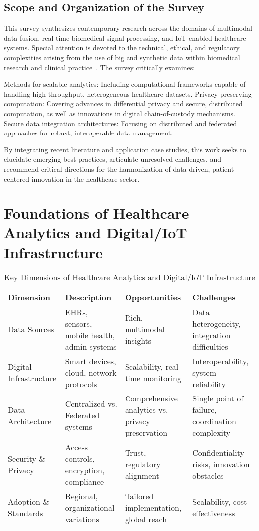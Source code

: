 \documentclass[sigconf]{acmart}
\begin{document}
\subsection{Scope and Organization of the Survey}

This survey synthesizes contemporary research across the domains of multimodal data fusion, real-time biomedical signal processing, and IoT-enabled healthcare systems. Special attention is devoted to the technical, ethical, and regulatory complexities arising from the use of big and synthetic data within biomedical research and clinical practice~\cite{ref91,ref92,ref106}. The survey critically examines:

Methods for scalable analytics: Including computational frameworks capable of handling high-throughput, heterogeneous healthcare datasets.
Privacy-preserving computation: Covering advances in differential privacy and secure, distributed computation, as well as innovations in digital chain-of-custody mechanisms.
Secure data integration architectures: Focusing on distributed and federated approaches for robust, interoperable data management.

By integrating recent literature and application case studies, this work seeks to elucidate emerging best practices, articulate unresolved challenges, and recommend critical directions for the harmonization of data-driven, patient-centered innovation in the healthcare sector.

\section{Foundations of Healthcare Analytics and Digital/IoT Infrastructure}

\begin{table*}[htbp]
\centering
\caption{Key Dimensions of Healthcare Analytics and Digital/IoT Infrastructure}
\label{tab:foundations_overview}
\begin{adjustbox}{max width=\textwidth}
\begin{tabular}{@{}llll@{}}
\toprule
Dimension & Description & Opportunities & Challenges \\
\midrule
Data Sources   & EHRs, sensors, mobile health, admin systems & Rich, multimodal insights & Data heterogeneity, integration difficulties \\
Digital Infrastructure & Smart devices, cloud, network protocols & Scalability, real-time monitoring & Interoperability, system reliability \\
Data Architecture & Centralized vs. Federated systems & Comprehensive analytics vs. privacy preservation & Single point of failure, coordination complexity \\
Security \& Privacy & Access controls, encryption, compliance & Trust, regulatory alignment & Confidentiality risks, innovation obstacles \\
Adoption \& Standards & Regional, organizational variations & Tailored implementation, global reach & Scalability, cost-effectiveness \\
\bottomrule
\end{tabular}
\end{adjustbox}
\end{table*}
\end{document}
